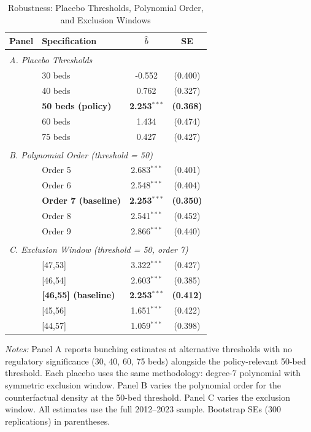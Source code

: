 \begin{table}[t]
\centering
\caption{Robustness: Placebo Thresholds, Polynomial Order, and Exclusion Windows}
\label{tab:robustness}
\small
\begin{tabular}{llcc}
\hline\hline
Panel & Specification & $\hat{b}$ & SE \\
\hline
\\[-6pt]
\multicolumn{4}{l}{\textit{A. Placebo Thresholds}} \\
& 30 beds & -0.552 & (0.400) \\
& 40 beds & 0.762 & (0.327) \\
& \textbf{50 beds (policy)} & \textbf{2.253}$^{***}$ & \textbf{(0.368)} \\
& 60 beds & 1.434 & (0.474) \\
& 75 beds & 0.427 & (0.427) \\
\\[-6pt]
\multicolumn{4}{l}{\textit{B. Polynomial Order (threshold = 50)}} \\
& Order 5 & 2.683$^{***}$ & (0.401) \\
& Order 6 & 2.548$^{***}$ & (0.404) \\
& \textbf{Order 7 (baseline)} & \textbf{2.253}$^{***}$ & \textbf{(0.350)} \\
& Order 8 & 2.541$^{***}$ & (0.452) \\
& Order 9 & 2.866$^{***}$ & (0.440) \\
\\[-6pt]
\multicolumn{4}{l}{\textit{C. Exclusion Window (threshold = 50, order 7)}} \\
& [47,53] & 3.322$^{***}$ & (0.427) \\
& [46,54] & 2.603$^{***}$ & (0.385) \\
& \textbf{[46,55] (baseline)} & \textbf{2.253}$^{***}$ & \textbf{(0.412)} \\
& [45,56] & 1.651$^{***}$ & (0.422) \\
& [44,57] & 1.059$^{***}$ & (0.398) \\
\hline\hline
\end{tabular}
\begin{tablenotes}
\item \textit{Notes:} Panel A reports bunching estimates at alternative thresholds with no regulatory significance (30, 40, 60, 75 beds) alongside the policy-relevant 50-bed threshold. Each placebo uses the same methodology: degree-7 polynomial with symmetric exclusion window. Panel B varies the polynomial order for the counterfactual density at the 50-bed threshold. Panel C varies the exclusion window. All estimates use the full 2012--2023 sample. Bootstrap SEs (300 replications) in parentheses.
\end{tablenotes}
\end{table}

